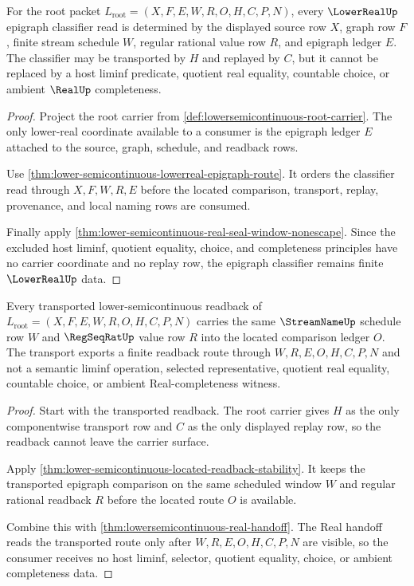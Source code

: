 \begin{theorem}
\label{thm:lowersemicontinuous-lowerreal-epigraph-classifier}
For the root packet
$L_{\mathrm{root}}=(X,F,E,W,R,O,H,C,P,N)$, every $\LowerRealUp$ epigraph
classifier read is determined by the displayed source row $X$, graph row $F$,
finite stream schedule $W$, regular rational value row $R$, and epigraph
ledger $E$. The classifier may be transported by $H$ and replayed by $C$, but
it cannot be replaced by a host liminf predicate, quotient real equality,
countable choice, or ambient $\RealUp$ completeness.
\end{theorem}
\begin{proof}
Project the root carrier from \autoref{def:lowersemicontinuous-root-carrier}.
The only lower-real coordinate available to a consumer is the epigraph ledger
$E$ attached to the source, graph, schedule, and readback rows.

Use \autoref{thm:lower-semicontinuous-lowerreal-epigraph-route}. It orders the
classifier read through $X,F,W,R,E$ before the located comparison, transport,
replay, provenance, and local naming rows are consumed.

Finally apply \autoref{thm:lower-semicontinuous-real-seal-window-nonescape}. Since
the excluded host liminf, quotient equality, choice, and completeness
principles have no carrier coordinate and no replay row, the epigraph
classifier remains finite $\LowerRealUp$ data.
\end{proof}

\begin{theorem}
\label{thm:lowersemicontinuous-regular-readback-transport}
Every transported lower-semicontinuous readback of
$L_{\mathrm{root}}=(X,F,E,W,R,O,H,C,P,N)$ carries the same $\StreamNameUp$
schedule row $W$ and $\RegSeqRatUp$ value row $R$ into the located comparison
ledger $O$. The transport exports a finite readback route through
$W,R,E,O,H,C,P,N$ and not a semantic liminf operation, selected representative,
quotient real equality, countable choice, or ambient Real-completeness
witness.
\end{theorem}
\begin{proof}
Start with the transported readback. The root carrier gives $H$ as the only
componentwise transport row and $C$ as the only displayed replay row, so the
readback cannot leave the carrier surface.

Apply \autoref{thm:lower-semicontinuous-located-readback-stability}. It keeps
the transported epigraph comparison on the same scheduled window $W$ and
regular rational readback $R$ before the located route $O$ is available.

Combine this with \autoref{thm:lowersemicontinuous-real-handoff}. The Real
handoff reads the transported route only after $W,R,E,O,H,C,P,N$ are visible,
so the consumer receives no host liminf, selector, quotient equality, choice,
or ambient completeness data.
\end{proof}


